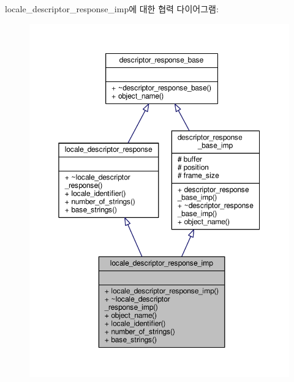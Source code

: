 locale\+\_\+descriptor\+\_\+response\+\_\+imp에 대한 협력 다이어그램\+:
\nopagebreak
\begin{figure}[H]
\begin{center}
\leavevmode
\includegraphics[width=350pt]{classavdecc__lib_1_1locale__descriptor__response__imp__coll__graph}
\end{center}
\end{figure}
